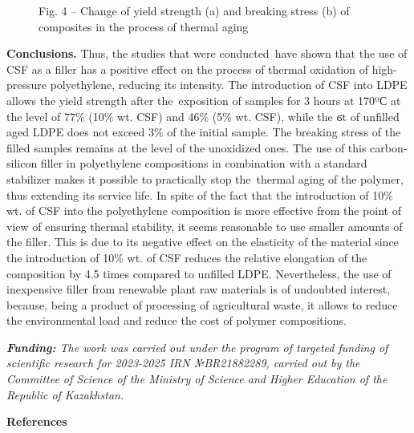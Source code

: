 \begin{figure}[H]
\begin{subfigure}[t]{0.4\textwidth}
    \end{subfigure}
    \caption*{Fig. 4 -- Change of yield strength (a) and breaking stress (b)
of composites in the process of thermal aging}
\end{figure}

\begin{multicols}{2}
{\bfseries Conclusions.} Thus, the studies that were conducted~have shown
that the use of CSF as a filler has a positive effect on the process of
thermal oxidation of high-pressure polyethylene, reducing its intensity.
The introduction of CSF into LDPE allows the yield strength after
the~exposition of samples for 3 hours at 170ºС at the level of 77\%
(10\% wt. CSF) and 46\% (5\% wt. CSF), while the ϭt of unfilled aged
LDPE does not exceed 3\% of the initial sample. The breaking stress of
the filled samples remains at the level of the unoxidized ones. The use
of this carbon-silicon filler in polyethylene compositions in
combination with a standard stabilizer makes it possible to practically
stop the~thermal aging of the polymer, thus extending its service life.
In spite of the fact that the introduction of 10\% wt. of CSF into the
polyethylene composition is more effective from the point of view of
ensuring thermal stability, it seems reasonable to use smaller amounts
of the filler. This is due to its negative effect on the elasticity of
the material since the introduction of 10\% wt. of CSF reduces the
relative elongation of the composition by 4.5 times compared to unfilled
LDPE. Nevertheless, the use of inexpensive filler from renewable plant
raw materials is of undoubted interest, because, being a product of
processing of agricultural waste, it allows to reduce the environmental
load and reduce the cost of polymer compositions.

\emph{{\bfseries Funding:} The work was carried out under the program of
targeted funding of scientific research for 2023-2025 IRN №BR21882289,
carried out by the Committee of Science of the Ministry of Science and
Higher Education of the Republic of Kazakhstan.}
\end{multicols}

\begin{center}
{\bfseries References}
\end{center}

